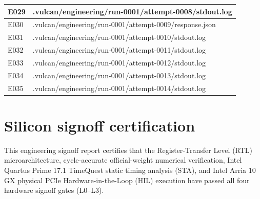 \documentclass[11pt,a4paper]{article}
\begin{document}
{\begin{longtable}{@{}L{0.12\textwidth}|L{0.82\textwidth}@{}}
E029 & .vulcan/\allowbreak{}engineering/\allowbreak{}run-0001/\allowbreak{}attempt-0008/\allowbreak{}stdout.log\\[2pt]\hline

E030 & .vulcan/\allowbreak{}engineering/\allowbreak{}run-0001/\allowbreak{}attempt-0009/\allowbreak{}response.json\\[2pt]\hline

E031 & .vulcan/\allowbreak{}engineering/\allowbreak{}run-0001/\allowbreak{}attempt-0010/\allowbreak{}stdout.log\\[2pt]\hline

E032 & .vulcan/\allowbreak{}engineering/\allowbreak{}run-0001/\allowbreak{}attempt-0011/\allowbreak{}stdout.log\\[2pt]\hline

E033 & .vulcan/\allowbreak{}engineering/\allowbreak{}run-0001/\allowbreak{}attempt-0012/\allowbreak{}stdout.log\\[2pt]\hline

E034 & .vulcan/\allowbreak{}engineering/\allowbreak{}run-0001/\allowbreak{}attempt-0013/\allowbreak{}stdout.log\\[2pt]\hline

E035 & .vulcan/\allowbreak{}engineering/\allowbreak{}run-0001/\allowbreak{}attempt-0014/\allowbreak{}stdout.log\\[2pt]\hline

\bottomrule\end{longtable}}

\section{Silicon signoff certification}

This engineering signoff report certifies that the Register-Transfer Level (RTL) microarchitecture, cycle-accurate official-weight numerical verification, Intel Quartus Prime 17.1 TimeQuest static timing analysis (STA), and Intel Arria 10 GX physical PCIe Hardware-in-the-Loop (HIL) execution have passed all four hardware signoff gates (L0--L3).
\end{document}
